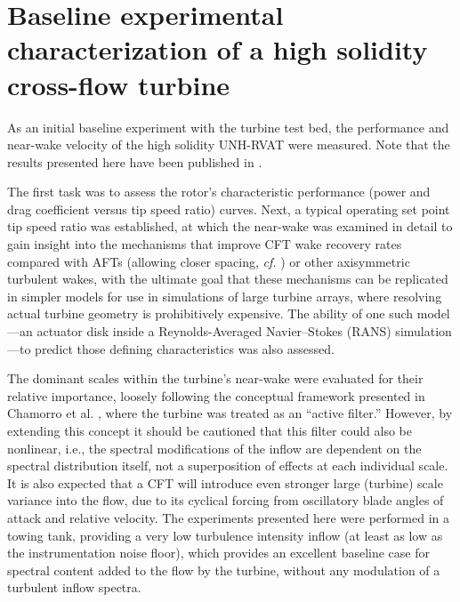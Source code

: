 \chapter{Baseline experimental characterization of a high solidity cross-flow
turbine}\label{chap:RVAT-baseline}

As an initial baseline experiment with the turbine test bed, the performance and
near-wake velocity of the high solidity UNH-RVAT were measured. Note that the
results presented here have been published in \cite{Bachant2013,
    Bachant2015-JoT}.

The first task was to assess the rotor's characteristic performance (power and
drag coefficient versus tip speed ratio) curves. Next, a typical operating set
point tip speed ratio was established, at which the near-wake was examined in
detail to gain insight into the mechanisms that improve CFT wake recovery rates
compared with AFTs (allowing closer spacing, \emph{cf.} \cite{Kinzel2012}) or
other axisymmetric turbulent wakes, with the ultimate goal that these mechanisms
can be replicated in simpler models for use in simulations of large turbine
arrays, where resolving actual turbine geometry is prohibitively expensive. The
ability of one such model---an actuator disk inside a Reynolds-Averaged
Navier--Stokes (RANS) simulation---to predict those defining characteristics was
also assessed.

The dominant scales within the turbine's near-wake were evaluated for their
relative importance, loosely following the conceptual framework presented in
Chamorro et al. \cite{Chamorro2012b}, where the turbine was treated as an
``active filter.'' However, by extending this concept it should be cautioned
that this filter could also be nonlinear, i.e., the spectral modifications of
the inflow are dependent on the spectral distribution itself, not a
superposition of effects at each individual scale. It is also expected that a
CFT will introduce even stronger large (turbine) scale variance into the flow,
due to its cyclical forcing from oscillatory blade angles of attack and relative
velocity. The experiments presented here were performed in a towing tank,
providing a very low turbulence intensity inflow (at least as low as the
instrumentation noise floor), which provides an excellent baseline case for
spectral content added to the flow by the turbine, without any modulation of a
turbulent inflow spectra.

